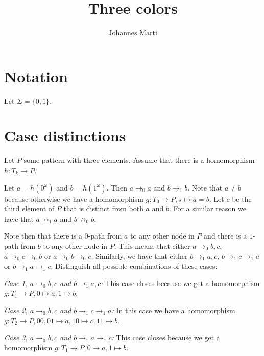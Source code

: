 \documentclass[a4paper]{article}
\title{Three colors}
\author{Johannes Marti}
\newcommand{\first}[1]{\mathsf{first}({#1})}
\newcommand{\last}[1]{\mathsf{last}({#1})}
\newcommand{\case}[2]{\vspace{1ex}\noindent\textit{Case #1, #2:}}
\begin{document}
\maketitle

\section{Notation}

Let $\Sigma = \{0,1\}$.

%

\section{Case distinctions}

Let $P$ some pattern with three elements. Assume that there is a
homomorphism $h : T_k \to P$.

Let $a = h(0^\omega)$ and $b = h(1^\omega)$. Then $a \rightarrow_0 a$
and $b \rightarrow_1 b$. Note that $a \neq b$ because otherwise we have
a homomorphism $g : T_0 \to P, \star \mapsto a=b$. Let $c$ be the third
element of $P$ that is distinct from both $a$ and $b$. For a similar
reason we have that $a \not \rightarrow_1 a$ and $b \not \rightarrow_0
b$.

Note then that there is a $0$-path from $a$ to any other node in $P$ and
there is a $1$-path from $b$ to any other node in $P$. This means that
either $a \rightarrow_0 b,c$, $a \rightarrow_0 c \rightarrow_0 b$ or $a
\rightarrow_0 b \rightarrow_0 c$. Similarly, we have that either $b
\rightarrow_1 a,c$, $b \rightarrow_1 c \rightarrow_1 a$ or $b
\rightarrow_1 a \rightarrow_1 c$. Distinguish all possible combinations
of these cases:

\case{1}{$a \rightarrow_0 b,c$ and $b \rightarrow_1 a,c$} This case
closes because we get a homomorphism $g : T_1 \to P, 0 \mapsto a, 1
\mapsto b$.

\case{2}{$a \rightarrow_0 b,c$ and $b \rightarrow_1 c \rightarrow_1 a$}
In this case we have a homomorphism $g : T_2 \to P, 00,01 \mapsto a, 10
\mapsto c, 11 \mapsto b$.

\case{3}{$a \rightarrow_0 b,c$ and $b \rightarrow_1 a \rightarrow_1 c$}
This case closes because we get a homomorphism $g : T_1 \to P, 0 \mapsto
a, 1 \mapsto b$.
\end{document}
